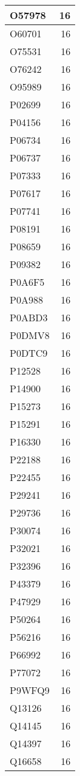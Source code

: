 \documentclass[
]{book}
\theoremstyle{definition}
\theoremstyle{definition}
\theoremstyle{definition}
\theoremstyle{definition}
\theoremstyle{remark}
\begin{document}
\begin{table}
\begin{tabular}{l|r}
\hline
O57978 & 16\\
\hline
O60701 & 16\\
\hline
O75531 & 16\\
\hline
O76242 & 16\\
\hline
O95989 & 16\\
\hline
P02699 & 16\\
\hline
P04156 & 16\\
\hline
P06734 & 16\\
\hline
P06737 & 16\\
\hline
P07333 & 16\\
\hline
P07617 & 16\\
\hline
P07741 & 16\\
\hline
P08191 & 16\\
\hline
P08659 & 16\\
\hline
P09382 & 16\\
\hline
P0A6F5 & 16\\
\hline
P0A988 & 16\\
\hline
P0ABD3 & 16\\
\hline
P0DMV8 & 16\\
\hline
P0DTC9 & 16\\
\hline
P12528 & 16\\
\hline
P14900 & 16\\
\hline
P15273 & 16\\
\hline
P15291 & 16\\
\hline
P16330 & 16\\
\hline
P22188 & 16\\
\hline
P22455 & 16\\
\hline
P29241 & 16\\
\hline
P29736 & 16\\
\hline
P30074 & 16\\
\hline
P32021 & 16\\
\hline
P32396 & 16\\
\hline
P43379 & 16\\
\hline
P47929 & 16\\
\hline
P50264 & 16\\
\hline
P56216 & 16\\
\hline
P66992 & 16\\
\hline
P77072 & 16\\
\hline
P9WFQ9 & 16\\
\hline
Q13126 & 16\\
\hline
Q14145 & 16\\
\hline
Q14397 & 16\\
\hline
Q16658 & 16\\

\end{tabular}
\end{table}
\end{document}
